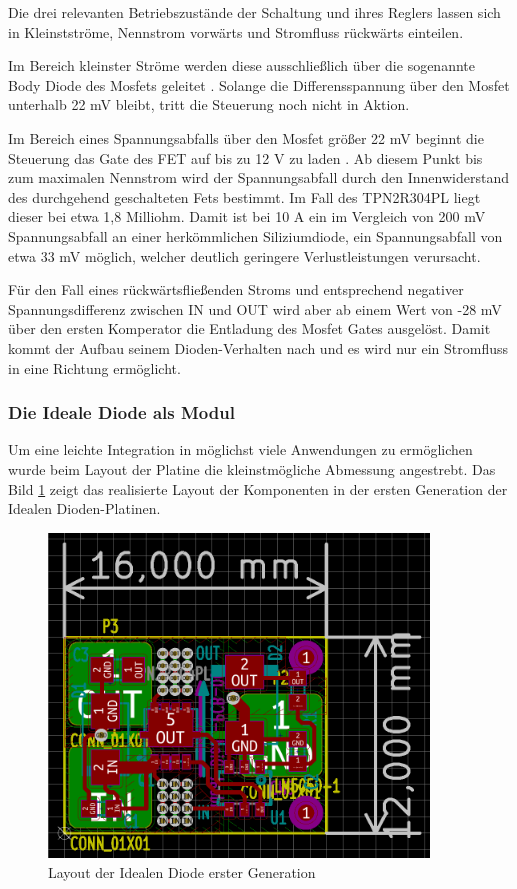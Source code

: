 Die drei relevanten Betriebszustände der Schaltung und ihres Reglers lassen sich in Kleinstströme, Nennstrom vorwärts und Stromfluss rückwärts einteilen.

Im Bereich kleinster Ströme werden diese ausschließlich über die sogenannte Body Diode des Mosfets geleitet \cite{Herberg2013}. Solange die Differensspannung über den Mosfet unterhalb 22 mV bleibt, tritt die Steuerung noch nicht in Aktion.

Im Bereich eines Spannungsabfalls über den Mosfet größer 22 mV beginnt die Steuerung das Gate des FET auf bis zu 12 V zu laden \cite{LM5050-1}. Ab diesem Punkt bis zum maximalen Nennstrom wird der Spannungsabfall durch den Innenwiderstand des durchgehend geschalteten Fets bestimmt. Im Fall des TPN2R304PL liegt dieser bei etwa 1,8 Milliohm. Damit ist bei 10 A ein im Vergleich von 200 mV Spannungsabfall an einer herkömmlichen Siliziumdiode, ein Spannungsabfall von etwa 33 mV möglich, welcher deutlich geringere Verlustleistungen verursacht.

Für den Fall eines rückwärtsfließenden Stroms und entsprechend negativer Spannungsdifferenz zwischen IN und OUT wird aber ab einem Wert von -28 mV über den ersten Komperator die Entladung des Mosfet Gates ausgelöst. Damit kommt der Aufbau seinem Dioden-Verhalten nach und es wird nur ein Stromfluss in eine Richtung ermöglicht.

\subsubsection{Die Ideale Diode als Modul}

Um eine leichte Integration in möglichst viele Anwendungen zu ermöglichen wurde beim Layout der Platine die kleinstmögliche Abmessung angestrebt. 
Das Bild \ref{fig:Layout der Idealen Diode erster Generation} zeigt das realisierte Layout der Komponenten in der ersten Generation der Idealen Dioden-Platinen.

\begin{figure}[H]
\centering
\includegraphics[width=0.9\textwidth]{bilder/Ideale_Diode/Ideale_Diode_Mini_rev01_ver00.png} 
\caption{Layout der Idealen Diode erster Generation} 
\label{fig:Layout der Idealen Diode erster Generation}
\end{figure}

